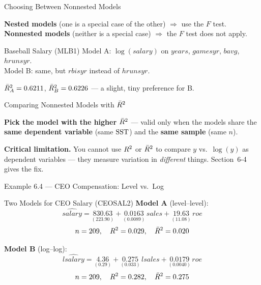 \documentclass[aspectratio=169, 12pt]{beamer}
\begin{document}
\begin{frame}{Choosing Between Nonnested Models}

  \textbf{Nested models} (one is a special case of the other) $\Rightarrow$ use the
  $F$ test. \textbf{Nonnested models} (neither is a special case) $\Rightarrow$ the
  $F$ test does not apply.

  \medskip

  \begin{examplebox}{Baseball Salary (MLB1)}
    Model A: $\log(salary)$ on $years$, $gamesyr$, $bavg$, $hrunsyr$. \\
    Model B: same, but $rbisyr$ instead of $hrunsyr$.

    \smallskip
    $\bar{R}^2_A = 0.6211$, \quad $\bar{R}^2_B = 0.6226$ --- a slight, tiny preference for B.
  \end{examplebox}

\end{frame}

\begin{frame}{Comparing Nonnested Models with $\bar{R}^2$}

  \begin{keybox}
    \textbf{Pick the model with the higher $\bar{R}^2$} --- valid only when the models share
    the \textbf{same dependent variable} (same $\text{SST}$) and the \textbf{same sample}
    (same $n$).
  \end{keybox}

  \medskip

  \begin{highlightbox}
    \textbf{Critical limitation.} You cannot use $R^2$ or $\bar{R}^2$ to compare $y$ vs.\
    $\log(y)$ as dependent variables --- they measure variation in \emph{different}
    things. Section~6-4 gives the fix.
  \end{highlightbox}

\end{frame}

\begin{frame}[shrink=8]{Example 6.4 --- CEO Compensation: Level vs.\ Log}

  \begin{examplebox}{Two Models for CEO Salary (CEOSAL2)}
    \textbf{Model A} (level--level):
    \[
      \widehat{salary} = \underset{(223.90)}{830.63}
        + \underset{(0.0089)}{0.0163}\, sales
        + \underset{(11.08)}{19.63}\, roe
    \]
    \[
      n = 209, \quad R^2 = 0.029, \quad \bar{R}^2 = 0.020
    \]

    \medskip

    \textbf{Model B} (log--log):
    \[
      \widehat{lsalary} = \underset{(0.29)}{4.36}
        + \underset{(0.033)}{0.275}\, lsales
        + \underset{(0.0040)}{0.0179}\, roe
    \]
    \[
      n = 209, \quad R^2 = 0.282, \quad \bar{R}^2 = 0.275
    \]
  \end{examplebox}

  \medskip

\end{frame}
\end{document}
